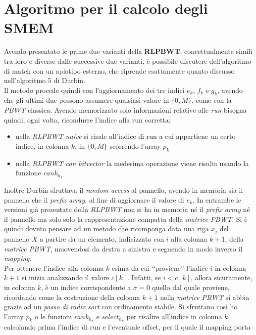 \section{Algoritmo per il calcolo degli SMEM}
Avendo presentato le prime due varianti della \textbf{RLPBWT}, concettualmente
simili tra loro e diverse dalle successive due varianti, è possibile discutere
dell'algoritmo di match con un aplotipo esterno, che riprende esattamente quanto
discusso nell'algoritmo 5 di Durbin.\\
Il metodo procede quindi con l'aggiornamento dei tre indici $e_k$, $f_k$ e
$g_k$, avendo che gli ultimi due possono assumere qualsiasi valore in $\{0,M\}$,
come con la \textit{PBWT} classica. Avendo memorizzato solo informazioni
relative alle \textit{run} bisogna quindi, ogni volta, ricondurre l'indice alla
run corretta:
\begin{itemize}
  \item nella \textit{RLPBWT naive} si risale all'indice di run a cui appartiene
  un certo indice, in colonna $k$, in $\{0,M\}$ scorrendo l'array $p_k$
  \item nella \textit{RLPBWT con bitvector} la medesima operazione viene risolta
  usando la funzione $rank_{h_k}$
\end{itemize}
Inoltre Durbin sfruttava il \textit{random access} al pannello, avendo in
memoria sia il pannello che il \textit{prefix array}, al fine di aggiornare il
valore di $e_k$. In entrambe le versioni già presentate della \textit{RLPBWT}
non si ha in memoria né il \textit{prefix array} né il pannello ma solo solo la
rappresentazione compatta della \textit{matrice PBWT}. Si è quindi dovuto
pensare ad un metodo che ricomponga data una riga $x_j$ del pannello $X$ a
partire da un elemento, indicizzato con $i$ alla colonna $k+1$, della
\textit{matrice PBWT}, muovendosi da destra a sinistra e seguendo in modo
inverso il \textit{mapping}.\\ 
Per ottenere l'indice alla colonna $k$-esima da cui ``proviene'' l'indice $i$ in
colonna $k+1$ si inizia analizzando il valore $c[k]$. Infatti, se $i<c[k]$,
allora sicuramente, in colonna $k$, è un indice corrispondente a $\sigma=0$
quello dal quale proviene, ricordando come la costruzione della colonna $k+1$
nella \textit{matrice PBWT} si abbia grazie ad un \textit{passo di radix sort}
con ordinamento stabile. Si sfruttano così ho l'array $p_k$ o le funzioni
$rank_{h_k}$ e $select_{h_k}$ per risalire all'indice in colonna $k$, calcolando
prima l'indice di run e l'eventuale offset, per il quale il mapping porta
